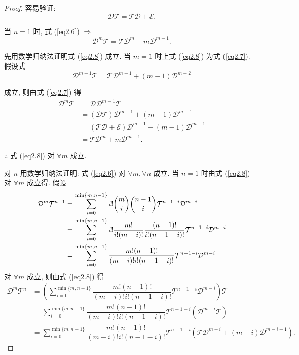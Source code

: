 \documentclass[color=black,device=normal,lang=cn,mode=geye]{elegantnote}
\begin{document}
\begin{proof}
    容易验证:
    \begin{equation}\label{eq2.7}
        \mathcal{DT}=\mathcal{TD}+\mathcal{E}.
    \end{equation}

    当 $n=1$ 时, 式 (\ref{eq2.6}) $\Rightarrow$
    \begin{equation}\label{eq2.8}
        \mathcal{D}^m\mathcal{T}=\mathcal{T}\mathcal{D}^m+m\mathcal{D}^{m-1}.
    \end{equation}

    先用数学归纳法证明式 (\ref{eq2.8}) 成立. 当 $m=1$ 时上式 (\ref{eq2.8}) 为式 (\ref{eq2.7}). 假设式
    \[\mathcal{D}^{m-1}\mathcal{T}=\mathcal{T}\mathcal{D}^{m-1}+(m-1)\mathcal{D}^{m-2}\]

    成立, 则由式 (\ref{eq2.7}) 得
    \begin{align*}
        \mathcal{D}^m\mathcal{T} & =\mathcal{D}\mathcal{D}^{m-1}\mathcal{T} \\
        & =(\mathcal{DT})\mathcal{D}^{m-1}+(m-1)\mathcal{D}^{m-1} \\
        & =(\mathcal{TD}+\mathcal{E})\mathcal{D}^{m-1}+(m-1)\mathcal{D}^{m-1} \\
        & =\mathcal{T}\mathcal{D}^m+m\mathcal{D}^{m-1}.
    \end{align*}

    $\therefore$ 式 (\ref{eq2.8}) 对 $\forall m$ 成立.

    对 $n$ 用数学归纳法证明: 式 (\ref{eq2.6}) 对 $\forall m,\forall n$ 成立. 当 $n=1$ 时由式 (\ref{eq2.8}) 对 $\forall m$ 成立得. 假设
    \begin{align*}
        \mathcal{D}^m\mathcal{T}^{n-1} & =\sum\limits_{i=0}^{\min\{m,n-1\}}i!\dbinom{m}{i}\dbinom{n-1}{i}\mathcal{T}^{n-1-i}\mathcal{D}^{m-i} \\
        & =\sum\limits_{i=0}^{\min\{m,n-1\}}i!\dfrac{m!}{i!(m-i)!}\dfrac{(n-1)!}{i!(n-1-i)!}\mathcal{T}^{n-1-i}\mathcal{D}^{m-i} \\
        & =\sum\limits_{i=0}^{\min\{m,n-1\}}\dfrac{m!(n-1)!}{(m-i)!i!(n-1-i)!}\mathcal{T}^{n-1-i}\mathcal{D}^{m-i}
    \end{align*}
    对 $\forall m$ 成立, 则由式 (\ref{eq2.8}) 得
    \begin{align*}
        \mathcal{D}^m\mathcal{T}^n & =\left(\sum\limits_{i=0}^{\min\{m,n-1\}}\dfrac{m!(n-1)!}{(m-i)!i!(n-1-i)!}\mathcal{T}^{n-1-i}\mathcal{D}^{m-i}\right)\mathcal{T} \\
        & =\sum\limits_{i=0}^{\min\{m,n-1\}}\dfrac{m!(n-1)!}{(m-i)!i!(n-1-i)!}\mathcal{T}^{n-1-i}(\mathcal{D}^{m-i}\mathcal{T}) \\
        & =\sum\limits_{i=0}^{\min\{m,n-1\}}\dfrac{m!(n-1)!}{(m-i)!i!(n-1-i)!}\mathcal{T}^{n-1-i}(\mathcal{T}\mathcal{D}^{m-i}+(m-i)\mathcal{D}^{m-i-1}).
    \end{align*}
    

\end{proof}
\end{document}
